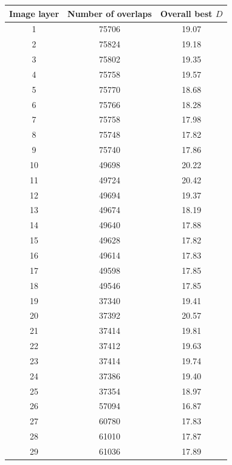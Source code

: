 \documentclass[letterpaper,11pt]{article}
\begin{document}
\begin{table}[!htb]
\centering
\begin{tabular}{c c c}
Image layer & Number of overlaps & Overall best $D$ \\
\hline
1           & 75706              & 19.07 \\
2           & 75824              & 19.18 \\
3           & 75802              & 19.35 \\
4           & 75758              & 19.57 \\
5           & 75770              & 18.68 \\
6           & 75766              & 18.28 \\
7           & 75758              & 17.98 \\
8           & 75748              & 17.82 \\
9           & 75740              & 17.86 \\
10          & 49698              & 20.22 \\
11          & 49724              & 20.42 \\
12          & 49694              & 19.37 \\
13          & 49674              & 18.19 \\
14          & 49640              & 17.88 \\
15          & 49628              & 17.82 \\
16          & 49614              & 17.83 \\
17          & 49598              & 17.85 \\
18          & 49546              & 17.85 \\
19          & 37340              & 19.41 \\
20          & 37392              & 20.57 \\
21          & 37414              & 19.81 \\
22          & 37412              & 19.63 \\
23          & 37414              & 19.74 \\
24          & 37386              & 19.40 \\
25          & 37354              & 18.97 \\
26          & 57094              & 16.87 \\
27          & 60780              & 17.83 \\
28          & 61010              & 17.87 \\
29          & 61036              & 17.89 \\

\end{tabular}
\end{table}
\end{document}
